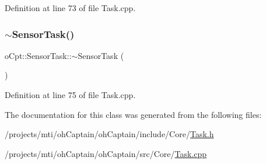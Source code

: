 Definition at line 73 of file Task.\+cpp.

\hypertarget{classo_cpt_1_1_sensor_task_a10e599626f58306aa05579f2c59a9b8a}{}\label{classo_cpt_1_1_sensor_task_a10e599626f58306aa05579f2c59a9b8a} 
\subsubsection{\texorpdfstring{$\sim$\+Sensor\+Task()}{~SensorTask()}}
{\footnotesize\ttfamily o\+Cpt\+::\+Sensor\+Task\+::$\sim$\+Sensor\+Task (\begin{DoxyParamCaption}{ }\end{DoxyParamCaption})\hspace{0.3cm}{\ttfamily [virtual]}}



Definition at line 75 of file Task.\+cpp.



The documentation for this class was generated from the following files\+:\begin{DoxyCompactItemize}
\item 
/projects/mti/oh\+Captain/oh\+Captain/include/\+Core/\hyperlink{_task_8h}{Task.\+h}\item 
/projects/mti/oh\+Captain/oh\+Captain/src/\+Core/\hyperlink{_task_8cpp}{Task.\+cpp}\end{DoxyCompactItemize}
